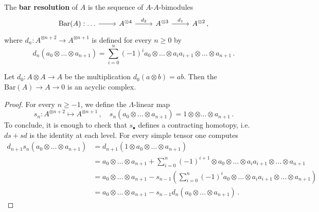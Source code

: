 	\begin{df}
		The \textbf{bar resolution} of $A$ is the sequence of $A$-$A$-bimodules
		\begin{equation*}
			\begin{tikzcd}
				\mathrm{Bar}(A) : \dots \ar[r] 
				& A^{\otimes 4} \ar[r, "d_{2}"]
				& A^{\otimes 3} \ar[r, "d_{1}"]
				& A^{\otimes 2}\,, %
			\end{tikzcd}
		\end{equation*}
		where $d_{n}:A^{\otimes n+2} \to A^{\otimes n+1}$ 
		is defined for every $n \ge 0$ by
		\begin{equation}\label{HHA-boundary}
			d_{n}(a_{0} \otimes \dots \otimes a_{n+1})
			= \sum_{i=0}^{n} (-1)^{i} a_{0} \otimes \dots \otimes a_{i}a_{i+1}
			\otimes \dots \otimes a_{n+1}\,.
		\end{equation}
	\end{df}
	
	\begin{lemma}
		Let $d_{0}:A \otimes A \to A$ be the multiplication $d_{0}(a \otimes b)=ab$.
		Then the $\mathrm{Bar}(A) \to A \to 0$ is an acyclic complex.
		\begin{proof}
			For every $n \ge -1$, we define the $\Lambda$-linear map
			\begin{equation*}
				s_{n} : A^{\otimes n+2} \longmapsto A^{\otimes n+1}\,,
				\quad s_{n}\left( a_{0} \otimes \dots \otimes a_{n+1} \right)
				= 1 \otimes \otimes \dots \otimes a_{n+1}\,.
			\end{equation*}
			To conclude, it is enough to check that $s_{\bullet}$
			defines a contracting homotopy, 
			i.e. $ds + sd$ is the identity at each level.
			For every simple tensor one computes
			\begin{align*}
				d_{n+1}s_{n}\left( a_{0} \otimes \dots \otimes a_{n+1} \right)
				&= d_{n+1}\left(1 \otimes a_{0} \otimes \dots \otimes a_{n+1} \right) \\
				&=  a_{0} \otimes \dots \otimes a_{n+1}
				+ \sum_{i=0}^{n} (-1)^{i+1} \otimes a_{0} \otimes \dots \otimes a_{i}a_{i+1}
				\otimes \dots \otimes a_{n+1} \\
				&= a_{0} \otimes \dots \otimes a_{n+1}
				- s_{n-1}\left( \sum_{i=0}^{n} (-1)^{i} a_{0} \otimes \dots \otimes a_{i}a_{i+1}
				\otimes \dots \otimes a_{n+1} \right) \\
				&= a_{0} \otimes \dots \otimes a_{n+1}
				- s_{n-1}d_{n}(a_{0} \otimes \dots \otimes a_{n+1})\,.
			\end{align*}\qedhere
		\end{proof}
	\end{lemma}
	
